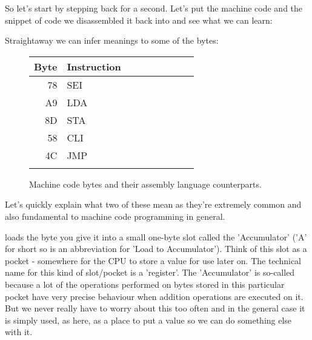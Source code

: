 So let's start by stepping back for a second. Let's put the machine code and the snippet of code we disassembled it
back into and see what we can learn:

\begin{minipage}[b]{0.45\linewidth}
\centering

\end{minipage}
\hspace{0.5cm}
\begin{minipage}[b]{0.45\linewidth}
\centering

\end{minipage}


Straightaway we can infer meanings to some of the bytes:

\begin{figure}[H]
  {
    \setlength{\tabcolsep}{3.0pt}
    \setlength\cmidrulewidth{\heavyrulewidth} %
    \begin{adjustbox}{width=3cm,center}

      \begin{tabular}{rllllllll}
        \toprule
        Byte & Instruction &\\
        \midrule
78 & SEI & \\
A9 & LDA & \\
8D & STA & \\
58 & CLI & \\
4C & JMP & \\
        \addlinespace
        \bottomrule
      \end{tabular}
    \end{adjustbox}
  }\caption{Machine code bytes and their assembly language counterparts.}
\end{figure}

Let's quickly explain what two of these mean as they're extremely common and also fundamental to
machine code programming in general.

 loads the byte you give it into a small one-byte slot called the 'Accumulator' ('A' for short
so  is an abbreviation for 'Load to Accumulator'). Think of this slot
as a pocket - somewhere for the CPU to store a value for use later on. The technical name for this kind of 
slot/pocket is a 'register'. The 'Accumulator' is so-called because a lot of the operations performed on
bytes stored in this particular pocket have very precise behaviour when addition operations are executed on
it. But we never really have to worry about this too often and in the general case it is simply used, as
here, as a place to put a value so we can do something else with it.

